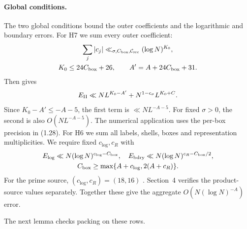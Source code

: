 \paragraph{Global conditions.}
The two global conditions bound the outer coefficients and the logarithmic and boundary errors.
For H7 we sum every outer coefficient:
{\scriptsize
\[
 \begin{gathered}
 \sum_j|c_j|\ll_{\sigma,C_{\rm box},\mathcal C_{\rm src}}
 (\log N)^{K_0},\\
 K_0\le24C_{\rm box}+26,\qquad A'=A+24C_{\rm box}+31.
 \end{gathered}
\]
}
Then \cite[(3.92)]{Z1} gives
\[
 E_{\rm II}\ll NL^{K_0-A'}+N^{1-c_\sigma}L^{K_0+C}.
\]
Since $K_0-A'\le-A-5$, the first term is $\ll NL^{-A-5}$.
For fixed $\sigma>0$, the second is also $O(NL^{-A-5})$.
The numerical application uses the per-box precision in (1.28).
For H6 we sum all labels, shells, boxes and representation multiplicities.
We require fixed $c_{\log},c_R$ with
\[
\begin{gathered}
 E_{\rm log}\ll N(\log N)^{c_{\log}-C_{\rm box}},\quad
 E_{\rm bdry}\ll N(\log N)^{c_R-C_{\rm box}/2},\\
 C_{\rm box}\ge\max\{A+c_{\log},2(A+c_R)\}.
\end{gathered}
\]
For the prime source, $(c_{\log},c_R)=(18,16)$
\cite[\S3 and Appendix~B]{Z1}.
Section~4 verifies the product-source values separately.
Together these give the aggregate $O(N(\log N)^{-A})$ error.

The next lemma checks packing on these rows.

